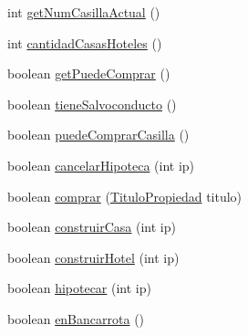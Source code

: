 \begin{DoxyCompactItemize}
\item 
int \hyperlink{classcivitas_1_1Jugador_ae60e7e2b72553535a3100e11a89e6948}{get\+Num\+Casilla\+Actual} ()
\item 
int \hyperlink{classcivitas_1_1Jugador_af26359708ca0a967152c3e38ef0e0c6b}{cantidad\+Casas\+Hoteles} ()
\item 
boolean \hyperlink{classcivitas_1_1Jugador_a1b548df1bff7883664b0848408ed0232}{get\+Puede\+Comprar} ()
\item 
boolean \hyperlink{classcivitas_1_1Jugador_a378e9a4405d9c44defeddd7488f5a9f9}{tiene\+Salvoconducto} ()
\item 
boolean \hyperlink{classcivitas_1_1Jugador_acfcfe8a5b5d26b2293cc727cd27acfac}{puede\+Comprar\+Casilla} ()
\item 
boolean \hyperlink{classcivitas_1_1Jugador_a3258e1efe659b753aae45e38d6d7a6e2}{cancelar\+Hipoteca} (int ip)
\item 
boolean \hyperlink{classcivitas_1_1Jugador_a8f31f1a403355a68600c591ddf6d5418}{comprar} (\hyperlink{classcivitas_1_1TituloPropiedad}{Titulo\+Propiedad} titulo)
\item 
boolean \hyperlink{classcivitas_1_1Jugador_ab98bd17b404c3b4eeb28657012ff99ff}{construir\+Casa} (int ip)
\item 
boolean \hyperlink{classcivitas_1_1Jugador_ab842fbff55eb5609c8b2f3a6a211d4eb}{construir\+Hotel} (int ip)
\item 
boolean \hyperlink{classcivitas_1_1Jugador_aad3e438212a101326c99e79c3c314f4b}{hipotecar} (int ip)
\item 
boolean \hyperlink{classcivitas_1_1Jugador_a00dffd4d41a489e824816f7fece988fc}{en\+Bancarrota} ()
\end{DoxyCompactItemize}

